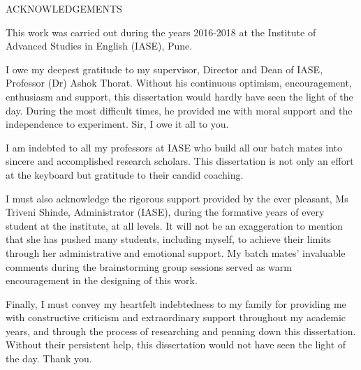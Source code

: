 \newpage
{}
\begin{center}
  \LARGE ACKNOWLEDGEMENTS
\end{center}


This work was carried out during the years 2016-2018 at the Institute of Advanced Studies in English (IASE), Pune. 

I owe my deepest gratitude to my supervisor, Director and Dean of IASE, Professor (Dr) Ashok Thorat. Without his continuous optimism, encouragement, enthusiasm and support, this dissertation would hardly have seen the light of the day. During the most difficult times, he provided me with moral support and the independence to experiment. Sir, I owe it all to you.

I am indebted to all my professors at IASE who build all our batch mates into sincere and accomplished research scholars. This dissertation is not only an effort at the keyboard but gratitude to their candid coaching.

I must also acknowledge the rigorous support provided by the ever pleasant, Ms Triveni Shinde, Administrator (IASE), during the formative years of every student at the institute, at all levels. It will not be an exaggeration to mention that she has pushed many students, including myself, to achieve their limits through her administrative and emotional support. My batch mates' invaluable comments during the brainstorming group sessions served as warm encouragement in the designing of this work. 

Finally, I must convey my heartfelt indebtedness to my family for providing me with constructive criticism and extraordinary support throughout my academic years, and through the process of researching and penning down this dissertation. Without their persistent help, this dissertation would not have seen the light of the day. Thank you.

\makeatletter
{} \hfill {}
\makeatother

